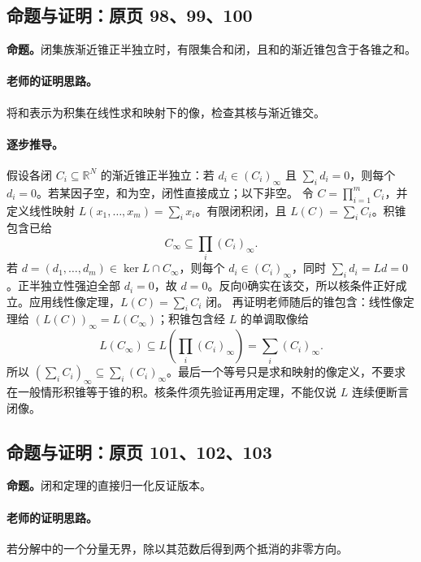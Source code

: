 \documentclass[11pt,a4paper]{article}
\newcommand{\R}{\mathbb{R}}\newcommand{\N}{\mathbb{N}}
\theoremstyle{definition}\newtheorem{definition}{定义}\newtheorem{example}{例}
\begin{document}
\subsection{命题与证明：原页 98、99、100}

\textbf{命题。}闭集族渐近锥正半独立时，有限集合和闭，且和的渐近锥包含于各锥之和。

\paragraph{老师的证明思路。}将和表示为积集在线性求和映射下的像，检查其核与渐近锥交。

\paragraph{逐步推导。}
假设各闭 $C_i\subseteq\R^N$ 的渐近锥正半独立：若 $d_i\in(C_i)_\infty$ 且 $\sum_i d_i=0$，则每个 $d_i=0$。若某因子空，和为空，闭性直接成立；以下非空。
令 $C=\prod_{i=1}^mC_i$，并定义线性映射 $L(x_1,\ldots,x_m)=\sum_i x_i$。有限闭积闭，且 $L(C)=\sum_iC_i$。积锥包含已给
\[C_\infty\subseteq\prod_i(C_i)_\infty.\]
若 $d=(d_1,\ldots,d_m)\in\ker L\cap C_\infty$，则每个 $d_i\in(C_i)_\infty$，同时 $\sum_id_i=Ld=0$。正半独立性强迫全部 $d_i=0$，故 $d=0$。反向0确实在该交，所以核条件正好成立。应用线性像定理，$L(C)=\sum_iC_i$ 闭。
再证明老师随后的锥包含：线性像定理给 $(L(C))_\infty=L(C_\infty)$；积锥包含经 $L$ 的单调取像给
\[L(C_\infty)\subseteq L\left(\prod_i(C_i)_\infty\right)=\sum_i(C_i)_\infty.\]
所以 $(\sum_iC_i)_\infty\subseteq\sum_i(C_i)_\infty$。最后一个等号只是求和映射的像定义，不要求在一般情形积锥等于锥的积。核条件须先验证再用定理，不能仅说 $L$ 连续便断言闭像。


\subsection{命题与证明：原页 101、102、103}

\textbf{命题。}闭和定理的直接归一化反证版本。

\paragraph{老师的证明思路。}若分解中的一个分量无界，除以其范数后得到两个抵消的非零方向。
\end{document}
